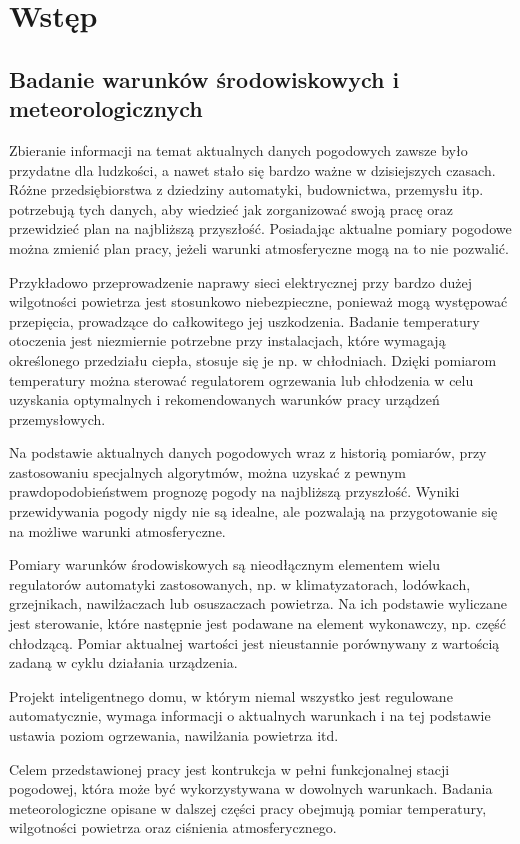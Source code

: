 \chapter{Wstęp}
\section*{Badanie warunków środowiskowych i meteorologicznych}
Zbieranie informacji na temat aktualnych danych pogodowych zawsze było przydatne dla ludzkości, a nawet stało się bardzo ważne w dzisiejszych czasach. Różne przedsiębiorstwa z dziedziny automatyki, budownictwa, przemysłu itp. potrzebują tych danych, aby wiedzieć jak zorganizować swoją pracę oraz przewidzieć plan na najbliższą przyszłość. Posiadając aktualne pomiary pogodowe można zmienić plan pracy, jeżeli warunki atmosferyczne mogą na to nie pozwalić.

Przykładowo przeprowadzenie naprawy sieci elektrycznej przy bardzo dużej wilgotności powietrza jest stosunkowo niebezpieczne, ponieważ mogą występować przepięcia, prowadzące do całkowitego jej uszkodzenia. Badanie temperatury otoczenia jest niezmiernie potrzebne przy instalacjach, które wymagają określonego przedziału ciepła, stosuje się je np. w chłodniach. Dzięki pomiarom temperatury można sterować regulatorem ogrzewania lub chłodzenia w celu uzyskania optymalnych i rekomendowanych warunków pracy urządzeń przemysłowych.

Na podstawie aktualnych danych pogodowych wraz z historią pomiarów, przy zastosowaniu specjalnych algorytmów, można uzyskać z pewnym prawdopodobieństwem prognozę pogody na najbliższą przyszłość. Wyniki przewidywania pogody nigdy nie są idealne, ale pozwalają na przygotowanie się na możliwe warunki atmosferyczne.

Pomiary warunków środowiskowych są nieodłącznym elementem wielu regulatorów automatyki zastosowanych, np. w klimatyzatorach, lodówkach, grzejnikach, nawilżaczach lub osuszaczach powietrza. Na ich podstawie wyliczane jest sterowanie, które następnie jest podawane na element wykonawczy, np. część chłodzącą. Pomiar aktualnej wartości jest nieustannie porównywany z wartością zadaną w cyklu działania urządzenia.

Projekt inteligentnego domu, w którym niemal wszystko jest regulowane automatycznie, wymaga informacji o aktualnych warunkach i na tej podstawie ustawia poziom ogrzewania, nawilżania powietrza itd.

Celem przedstawionej pracy jest kontrukcja w pełni funkcjonalnej stacji pogodowej, która może być wykorzystywana w dowolnych warunkach. Badania meteorologiczne opisane w dalszej części pracy obejmują pomiar temperatury, wilgotności powietrza oraz ciśnienia atmosferycznego.

